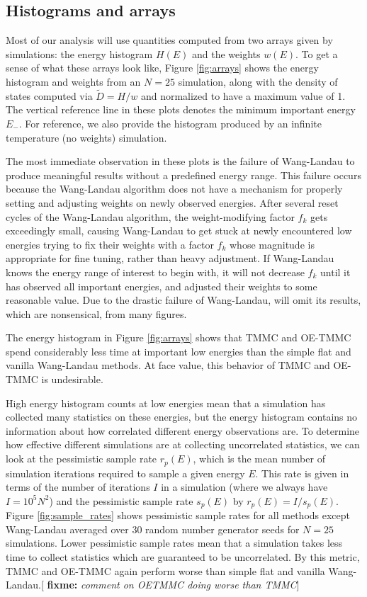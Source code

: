 \documentclass[11pt]{article}
\newcommand{\p}[1]{\left(#1\right)} %
\newcommand{\red}[1]{{\bf \color{red} #1}}
\newcommand{\fixme}[1]{[\red{fixme:} \emph{#1}]}
\begin{document}
\subsection{Histograms and arrays}
\label{sec:histograms}

Most of our analysis will use quantities computed from two arrays
given by simulations: the energy histogram $H\p{E}$ and the weights
$w\p{E}$. To get a sense of what these arrays look like, Figure
\ref{fig:arrays} shows the energy histogram and weights from an $N=25$
simulation, along with the density of states computed via $\tilde
D=H/w$ and normalized to have a maximum value of 1. The vertical
reference line in these plots denotes the minimum important energy
$E_-$. For reference, we also provide the histogram produced by an
infinite temperature (no weights) simulation.

The most immediate observation in these plots is the failure of
Wang-Landau to produce meaningful results without a predefined energy
range. This failure occurs because the Wang-Landau algorithm does not
have a mechanism for properly setting and adjusting weights on newly
observed energies. After several reset cycles of the Wang-Landau
algorithm, the weight-modifying factor $f_k$ gets exceedingly small,
causing Wang-Landau to get stuck at newly encountered low energies
trying to fix their weights with a factor $f_k$ whose magnitude is
appropriate for fine tuning, rather than heavy adjustment. If
Wang-Landau knows the energy range of interest to begin with, it will
not decrease $f_k$ until it has observed all important energies, and
adjusted their weights to some reasonable value. Due to the drastic
failure of Wang-Landau, will omit its results, which are nonsensical,
from many figures.

The energy histogram in Figure \ref{fig:arrays} shows that TMMC and
OE-TMMC spend considerably less time at important low energies than
the simple flat and vanilla Wang-Landau methods. At face value, this
behavior of TMMC and OE-TMMC is undesirable.

High energy histogram counts at low energies mean that a simulation
has collected many statistics on these energies, but the energy
histogram contains no information about how correlated different
energy observations are. To determine how effective different
simulations are at collecting uncorrelated statistics, we can look at
the pessimistic sample rate $r_p\p{E}$, which is the mean number of
simulation iterations required to sample a given energy $E$. This rate
is given in terms of the number of iterations $I$ in a simulation
(where we always have $I=10^5N^2$) and the pessimistic sample rate
$s_p\p{E}$ by $r_p\p{E}=I/s_p\p{E}$. Figure \ref{fig:sample_rates}
shows pessimistic sample rates for all methods except Wang-Landau
averaged over 30 random number generator seeds for $N=25$
simulations. Lower pessimistic sample rates mean that a simulation
takes less time to collect statistics which are guaranteed to be
uncorrelated. By this metric, TMMC and OE-TMMC again perform worse
than simple flat and vanilla Wang-Landau.\fixme{comment on OETMMC
  doing worse than TMMC}
\end{document}

